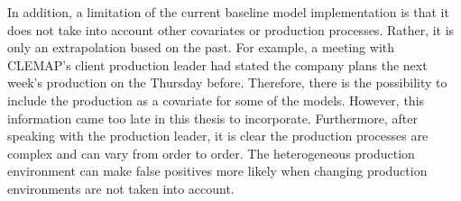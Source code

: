 In addition, a limitation of the current baseline model implementation is that it does not take into account other covariates or production processes. Rather, it is only an extrapolation based on the past. For example, a meeting with CLEMAP's client production leader had stated the company plans the next week's production on the Thursday before. Therefore, there is the possibility to include the production as a covariate for some of the models. However, this information came too late in this thesis to incorporate. Furthermore, after speaking with the production leader, it is clear the production processes are complex and can vary from order to order. The heterogeneous production environment can make false positives more likely when changing production environments are not taken into account.